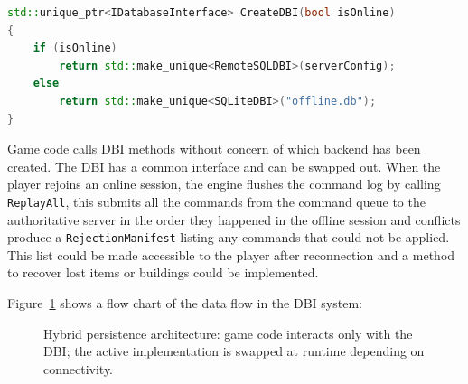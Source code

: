 \documentclass{article}
\begin{document}
\begin{lstlisting}[language=C++, caption={Connectivity-aware DBI factory}]
std::unique_ptr<IDatabaseInterface> CreateDBI(bool isOnline)
{
    if (isOnline)
        return std::make_unique<RemoteSQLDBI>(serverConfig);
    else
        return std::make_unique<SQLiteDBI>("offline.db");
}
\end{lstlisting}

Game code calls DBI methods without concern of which backend has been created. The DBI has a common interface and can be swapped out. When the player rejoins an online session, the engine flushes the command log by calling \texttt{ReplayAll}, this submits all the commands from the command queue to the authoritative server in the order they happened in the offline session and conflicts produce a \texttt{RejectionManifest} listing any commands that could not be applied. This list could be made accessible to the player after reconnection and a method to recover lost items or buildings could be implemented.

Figure~\ref{fig:architecture} shows a flow chart of the data flow in the DBI system:

\begin{figure}[h]
\flushleft
{}
\caption{Hybrid persistence architecture: game code interacts only with the DBI; the active implementation is swapped at runtime depending on connectivity.}
\label{fig:architecture}
\end{figure}
\end{document}
